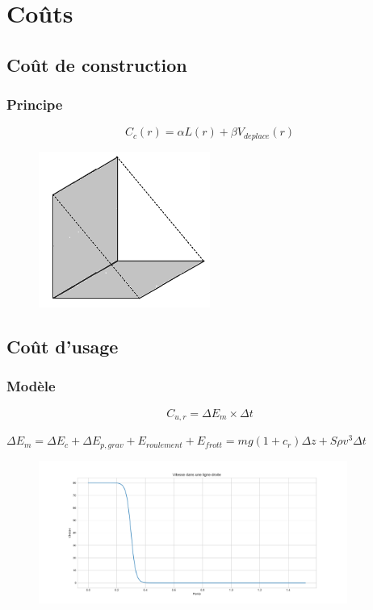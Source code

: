 \documentclass{beamer}[11pt]
\begin{document}
	\section{Coûts}

		\subsection{Coût de construction}

			\begin{frame}
				\frametitle{Principe}

				$$C_{c}(r) = \alpha L(r) + \beta V_{deplace}(r)$$

				\begin{figure}[t]
					\centering
						\includegraphics[width=0.5\textwidth]{Pics/Tunn.png}
				\end{figure}

			\end{frame}

		\subsection{Coût d'usage}

			\begin{frame}
				\frametitle{Modèle}

				$$C_{u,r} = \Delta E_{m} \times \Delta t$$

				$\Delta E_{m} = \Delta E_{c} + \Delta E_{p,grav} + E_{roulement} + E_{frott} = m g (1+c_{r}) \Delta z + S \rho v^{3} \Delta t$

				\begin{figure}[t]
					\centering
						\includegraphics[width=0.9\textwidth]{Pics/vit.png}
				\end{figure}

			\end{frame}
\end{document}
